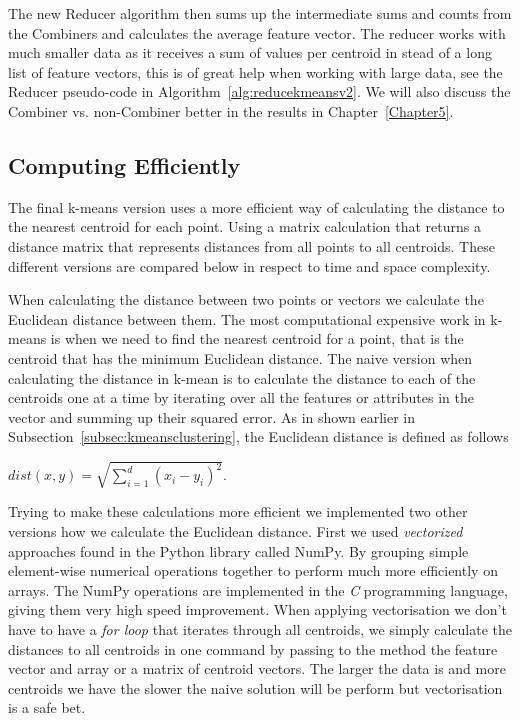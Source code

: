 The new Reducer algorithm then sums up the intermediate sums and counts from the Combiners and calculates the average feature vector. The reducer works with much smaller data as it receives a sum of values per centroid in stead of a long list of feature vectors, this is of great help when working with large data, see the Reducer pseudo-code in Algorithm~\ref{alg:reducekmeansv2}. We will also discuss the Combiner vs. non-Combiner better in the results in Chapter~\ref{Chapter5}.


\subsection{Computing Efficiently}
The final k-means version uses a more efficient way of calculating the distance to the nearest centroid for each point. Using a matrix calculation that returns a distance matrix that represents distances from all points to all centroids. These different versions are compared below in respect to time and space complexity.

When calculating the distance between two points or vectors we calculate the Euclidean distance between them. The most computational expensive work in k-means is when we need to find the nearest centroid for a point, that is the centroid that has the minimum Euclidean distance. The naive version when calculating the distance in k-mean is to calculate the distance to each of the centroids one at a time by iterating over all the features or attributes in the vector and summing up their squared error. As in shown earlier in Subsection~\ref{subsec:kmeansclustering}, the Euclidean distance is defined as follows

\begin{center}
$dist(x,y) = \sqrt{\displaystyle \sum_{i=1}^{d}(x_i-y_i)^2} $.
\end{center}

Trying to make these calculations more efficient we implemented two other versions how we calculate the Euclidean distance. First we used \textit{vectorized} approaches found in the Python library called NumPy. By grouping simple element-wise numerical operations together to perform much more efficiently on arrays. The NumPy operations are implemented in the \textit{C} programming language, giving them very high speed improvement. When applying vectorisation we don't have to have a \textit{for loop} that iterates through all centroids, we simply calculate the distances to all centroids in one command by passing to the method the feature vector and array or a matrix of centroid vectors. The larger the data is and more centroids we have the slower the naive solution will be perform but vectorisation is a safe bet. 

